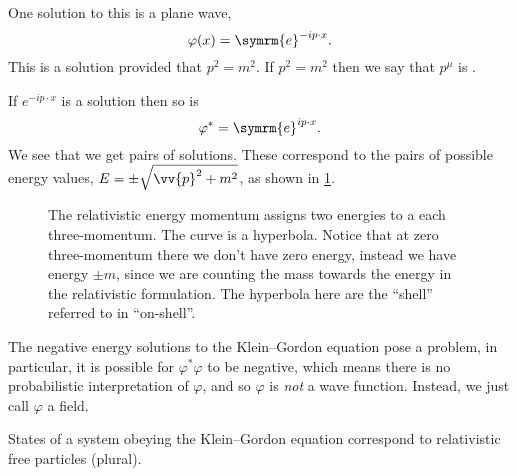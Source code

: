 \documentclass[fleqn]{NotesClass}
\newcommand{\e}{\symrm{e}}
\begin{document}
    One solution to this is a plane wave,
    \begin{equation}
        \varphi(x) = \e^{-ip \cdot x}.
    \end{equation}
    This is a solution provided that \(p^2 = m^2\).
    If \(p^2 = m^2\) then we say that \(p^\mu\) is .
    
    If \(e^{-ip\cdot x}\) is a solution then so is
    \begin{equation}
        \varphi^* = \e^{ip\cdot x}.
    \end{equation}
    We see that we get pairs of solutions.
    These correspond to the pairs of possible energy values, \(E = \pm \sqrt{\vv{p}^2 + m^2}\), as shown in \cref{fig:energy-momentum relation relativistic}.
    
    \begin{figure}
        \caption[Relativistic energy-momentum relation]{The relativistic energy momentum assigns two energies to a each three-momentum. The curve is a hyperbola. Notice that at zero three-momentum there we don't have zero energy, instead we have energy \(\pm m\), since we are counting the mass towards the energy in the relativistic formulation. The hyperbola here are the \enquote{shell} referred to in \enquote{on-shell}.}
        \label{fig:energy-momentum relation relativistic}
    \end{figure}
    
    The negative energy solutions to the Klein--Gordon equation pose a problem, in particular, it is possible for \(\varphi^* \varphi\) to be negative, which means there is no probabilistic interpretation of \(\varphi\), and so \(\varphi\) is \emph{not} a wave function.
    Instead, we just call \(\varphi\) a field.
    
    States of a system obeying the Klein--Gordon equation correspond to relativistic free particles (plural).
    
\end{document}
